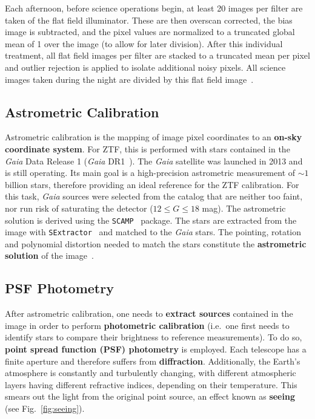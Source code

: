 Each afternoon, before science operations begin, at least 20 images per filter are taken of the flat field illuminator. These are then overscan corrected, the bias image is subtracted, and the pixel values are normalized to a truncated global mean of 1 over the image (to allow for later division). After this individual treatment, all flat field images per filter are stacked to a truncated mean per pixel and outlier rejection is applied to isolate additional noisy pixels. All science images taken during the night are divided by this flat field image~\cite{Masci2019a}.

\subsection{Astrometric Calibration}
Astrometric calibration is the mapping of image pixel coordinates to an \textbf{on-sky coordinate system}. For ZTF, this is performed with stars contained in the \textit{Gaia} Data Release 1 (\textit{Gaia} DR1~). The \textit{Gaia} satellite was launched in 2013 and is still operating. Its main goal is a high-precision astrometric measurement of $\sim1$ billion stars, therefore providing an ideal reference for the ZTF calibration. For this task, \textit{Gaia} sources were selected from the catalog that are neither too faint, nor run risk of saturating the detector ($12 \leq G \leq 18$ mag). The astrometric solution is derived using the \texttt{SCAMP}~ package. The stars are extracted from the image with \texttt{SExtractor}~ and matched to the \textit{Gaia} stars. The pointing, rotation and polynomial distortion needed to match the stars constitute the \textbf{astrometric solution} of the image~.

\subsection{PSF Photometry}\label{psfphot}
After astrometric calibration, one needs to \textbf{extract sources} contained in the image in order to perform \textbf{photometric calibration} (i.e.\ one first needs to identify stars to compare their brightness to reference measurements). To do so, \textbf{point spread function (PSF) photometry} is employed. Each telescope has a finite aperture and therefore suffers from \textbf{diffraction}. Additionally, the Earth's atmosphere is constantly and turbulently changing, with different atmospheric layers having different refractive indices, depending on their temperature. This smears out the light from the original point source, an effect known as \textbf{seeing} (see Fig.~\ref{fig:seeing}).

